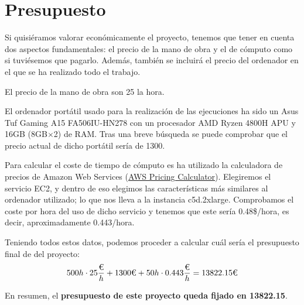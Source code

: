 \section{Presupuesto}

Si quisiéramos valorar económicamente el proyecto, tenemos que tener en cuenta dos aspectos fundamentales: el precio de la mano de obra y el de cómputo como si tuviésemos que pagarlo. 
Además, también se incluirá el precio del ordenador en el que se ha realizado todo el trabajo.

El precio de la mano de obra son 25\texteuro\xspace la hora. 

El ordenador portátil usado para la realización de las ejecuciones ha sido un Asus Tuf Gaming A15 FA506IU-HN278 con un procesador AMD\textregistered\xspace Ryzen\texttrademark\xspace 7 4800H APU
y 16GB (8GB$\times$2) de RAM. 
Tras una breve búsqueda se puede comprobar que el precio actual de dicho portátil sería de 1300\texteuro\xspace. 

Para calcular el coste de tiempo de cómputo es ha utilizado la calculadora de precios de Amazon Web Services (\href{https://calculator.aws}{AWS Pricing Calculator}). 
Elegiremos el servicio EC2, y dentro de eso elegimos las características más similares al ordenador utilizado; lo que nos lleva a la instancia c5d.2xlarge. 
Comprobamos el coste por hora del uso de dicho servicio y tenemos que este sería 0.48\$/hora, es decir, aproximadamente 0.443\texteuro /hora.

Teniendo todos estos datos, podemos proceder a calcular cuál sería el presupuesto final de del proyecto:
\begin{equation*}
500h\cdot 25\dfrac{\text{\texteuro}}{h} + 1300\text{\texteuro} + 50h\cdot 0.443\dfrac{\text{\texteuro}}{h} = 13822.15\text{\texteuro}
\end{equation*}

En resumen, el \textbf{presupuesto de este proyecto queda fijado en 13822.15\texteuro}.
